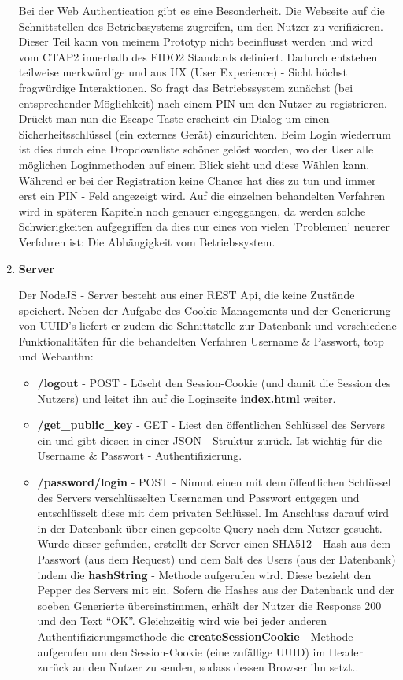 \begin{enumerate}
Bei der Web Authentication gibt es eine Besonderheit. Die Webseite auf die Schnittstellen des Betriebssystems zugreifen, um den Nutzer zu verifizieren. Dieser Teil kann von meinem Prototyp nicht beeinflusst werden und wird vom CTAP2 innerhalb des FIDO2 Standards definiert. Dadurch entstehen teilweise merkwürdige und aus UX (User Experience) - Sicht höchst fragwürdige Interaktionen. So fragt das Betriebssystem zunächst (bei entsprechender Möglichkeit) nach einem PIN um den Nutzer zu registrieren. Drückt man nun die Escape-Taste erscheint ein Dialog um einen Sicherheitsschlüssel (ein externes Gerät) einzurichten. Beim Login wiederrum ist dies durch eine Dropdownliste schöner gelöst worden, wo der User alle möglichen Loginmethoden auf einem Blick sieht und diese Wählen kann. Während er bei der Registration keine Chance hat dies zu tun und immer erst ein PIN - Feld angezeigt wird. Auf die einzelnen behandelten Verfahren wird in späteren Kapiteln noch genauer eingeggangen, da werden solche Schwierigkeiten aufgegriffen da dies nur eines von vielen 'Problemen' neuerer Verfahren ist: Die Abhängigkeit vom Betriebssystem.

\item \textbf{Server}

Der NodeJS - Server besteht aus einer REST Api, die keine Zustände speichert. Neben der Aufgabe des Cookie Managements und der Generierung von UUID's liefert er zudem die Schnittstelle zur Datenbank und verschiedene Funktionalitäten für die behandelten Verfahren Username \& Passwort, \ac{totp} und Webauthn:

\begin{itemize}
 \item \textbf{/logout} - POST - Löscht den Session-Cookie (und damit die Session des Nutzers) und leitet ihn auf die Loginseite \textbf{index.html} weiter.

 \item \textbf{/get\_public\_key} - GET - Liest den öffentlichen Schlüssel des Servers ein und gibt diesen in einer JSON - Struktur zurück. Ist wichtig für die Username \& Passwort - Authentifizierung.

 \item \textbf{/password/login} - POST - Nimmt einen mit dem öffentlichen Schlüssel des Servers verschlüsselten Usernamen und Passwort entgegen und entschlüsselt diese mit dem privaten Schlüssel. Im Anschluss darauf wird in der Datenbank über einen gepoolte Query nach dem Nutzer gesucht. Wurde dieser gefunden, erstellt der Server einen SHA512 - Hash aus dem Passwort (aus dem Request) und dem Salt des Users (aus der Datenbank) indem die \textbf{hashString} - Methode aufgerufen wird. Diese bezieht den Pepper des Servers mit ein. Sofern die Hashes aus der Datenbank und der soeben Generierte übereinstimmen, erhält der Nutzer die Response 200 und den Text ``OK''. Gleichzeitig wird wie bei jeder anderen Authentifizierungsmethode die \textbf{createSessionCookie} - Methode aufgerufen um den Session-Cookie (eine zufällige UUID) im Header zurück an den Nutzer zu senden, sodass dessen Browser ihn setzt..
 \newpage
 

\end{itemize}
\end{enumerate}
